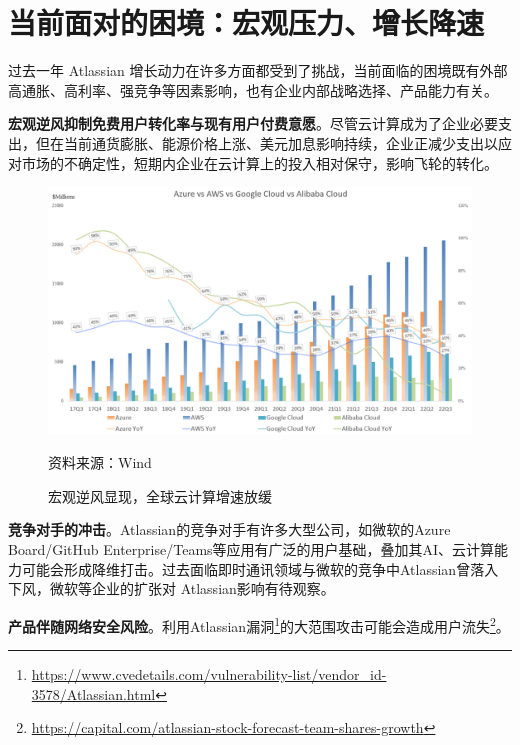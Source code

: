 \section{当前面对的困境：宏观压力、增长降速}

过去一年 Atlassian 增长动力在许多方面都受到了挑战，当前面临的困境既有外部高通胀、高利率、强竞争等因素影响，也有企业内部战略选择、产品能力有关。

\textbf{宏观逆风抑制免费用户转化率与现有用户付费意愿}。尽管云计算成为了企业必要支出，但在当前通货膨胀、能源价格上涨、美元加息影响持续，企业正减少支出以应对市场的不确定性，短期内企业在云计算上的投入相对保守，影响飞轮的转化。
\begin{figure}[H]
    \caption{宏观逆风显现，全球云计算增速放缓}
    \begin{center}
        \includegraphics[width=0.8\linewidth]{img/cloud.png}
    \end{center}
    \footnotesize{资料来源：Wind}
\end{figure}

\textbf{竞争对手的冲击}。Atlassian的竞争对手有许多大型公司，如微软的Azure Board/GitHub Enterprise/Teams等应用有广泛的用户基础，叠加其AI、云计算能力可能会形成降维打击。过去面临即时通讯领域与微软的竞争中Atlassian曾落入下风，微软等企业的扩张对 Atlassian影响有待观察。

\textbf{产品伴随网络安全风险}。利用Atlassian漏洞\footnote{\url{https://www.cvedetails.com/vulnerability-list/vendor_id-3578/Atlassian.html}}的大范围攻击可能会造成用户流失\footnote{\url{https://capital.com/atlassian-stock-forecast-team-shares-growth}}。

